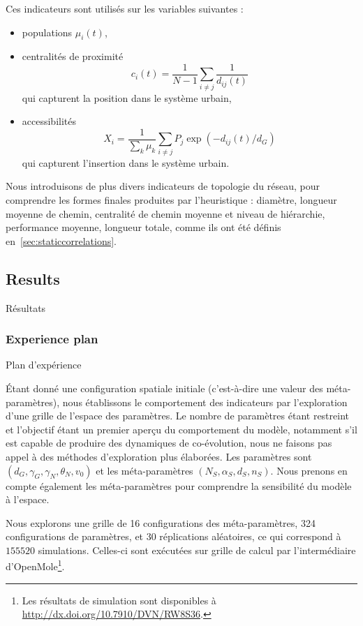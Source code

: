 
Ces indicateurs sont utilisés sur les variables suivantes :
\begin{itemize}
	\item populations $\mu_i(t)$,
	\item centralités de proximité
	\[c_i(t) = \frac{1}{N-1}\sum_{i\neq j} \frac{1}{d_{ij}(t)}\]
	qui capturent la position dans le système urbain,
	\item accessibilités \[X_i = \frac{1}{\sum_k \mu_k}\sum_{i\neq j} P_j \exp{\left(- d_{ij}(t)/d_G\right)}\] qui capturent l'insertion dans le système urbain.
\end{itemize}



Nous introduisons de plus divers indicateurs de topologie du réseau, pour comprendre les formes finales produites par l'heuristique : diamètre, longueur moyenne de chemin, centralité de chemin moyenne et niveau de hiérarchie, performance moyenne, longueur totale, comme ils ont été définis en~\ref{sec:staticcorrelations}.




\subsection{Results}{Résultats}


\subsubsection{Experience plan}{Plan d'expérience}

Étant donné une configuration spatiale initiale (c'est-à-dire une valeur des méta-paramètres), nous établissons le comportement des indicateurs par l'exploration d'une grille de l'espace des paramètres. Le nombre de paramètres étant restreint et l'objectif étant un premier aperçu du comportement du modèle, notamment s'il est capable de produire des dynamiques de co-évolution, nous ne faisons pas appel à des méthodes d'exploration plus élaborées. Les paramètres sont $(d_G,\gamma_G,\gamma_N,\theta_N,v_0)$ et les méta-paramètres $(N_S,\alpha_S,d_S,n_S)$. Nous prenons en compte également les méta-paramètres pour comprendre la sensibilité du modèle à l'espace.

Nous explorons une grille de 16 configurations des méta-paramètres, 324 configurations de paramètres, et 30 réplications aléatoires, ce qui correspond à $155520$ simulations. Celles-ci sont exécutées sur grille de calcul par l'intermédiaire d'OpenMole\footnote{Les résultats de simulation sont disponibles à \url{http://dx.doi.org/10.7910/DVN/RW8S36}.}.



